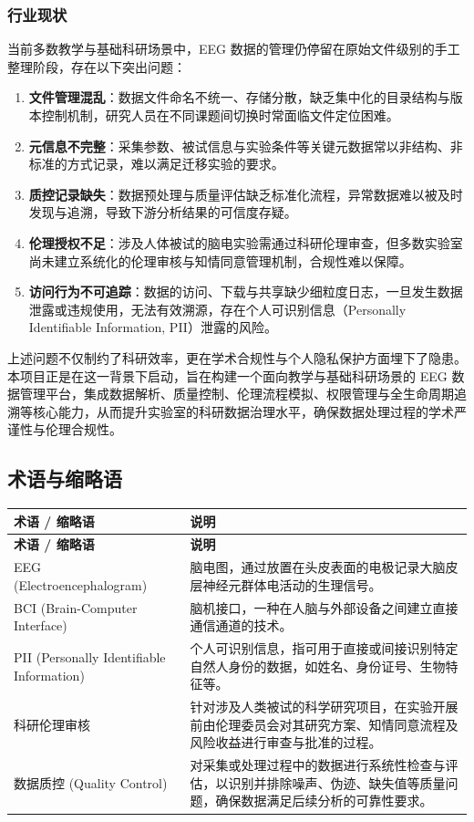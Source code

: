 \subsubsection{行业现状}

当前多数教学与基础科研场景中，EEG 数据的管理仍停留在原始文件级别的手工整理阶段，存在以下突出问题：

\begin{enumerate}
  \item \textbf{文件管理混乱}：数据文件命名不统一、存储分散，缺乏集中化的目录结构与版本控制机制，研究人员在不同课题间切换时常面临文件定位困难。
  \item \textbf{元信息不完整}：采集参数、被试信息与实验条件等关键元数据常以非结构、非标准的方式记录，难以满足迁移实验的要求。
  \item \textbf{质控记录缺失}：数据预处理与质量评估缺乏标准化流程，异常数据难以被及时发现与追溯，导致下游分析结果的可信度存疑。
  \item \textbf{伦理授权不足}：涉及人体被试的脑电实验需通过科研伦理审查，但多数实验室尚未建立系统化的伦理审核与知情同意管理机制，合规性难以保障。
  \item \textbf{访问行为不可追踪}：数据的访问、下载与共享缺少细粒度日志，一旦发生数据泄露或违规使用，无法有效溯源，存在个人可识别信息（Personally Identifiable Information, PII）泄露的风险。
\end{enumerate}

上述问题不仅制约了科研效率，更在学术合规性与个人隐私保护方面埋下了隐患。本项目正是在这一背景下启动，旨在构建一个面向教学与基础科研场景的 EEG 数据管理平台，集成数据解析、质量控制、伦理流程模拟、权限管理与全生命周期追溯等核心能力，从而提升实验室的科研数据治理水平，确保数据处理过程的学术严谨性与伦理合规性。

\subsection{术语与缩略语}

\begin{longtable}{|p{36mm}|p{116mm}|}
\hline
\textbf{术语 / 缩略语} & \textbf{说明} \\
\hline
\endfirsthead
\hline
\textbf{术语 / 缩略语} & \textbf{说明} \\
\hline
\endhead
\hline
\endfoot
EEG (Electroencephalogram) & 脑电图，通过放置在头皮表面的电极记录大脑皮层神经元群体电活动的生理信号。 \\
\hline
BCI (Brain-Computer Interface) & 脑机接口，一种在人脑与外部设备之间建立直接通信通道的技术。 \\
\hline
PII (Personally Identifiable Information) & 个人可识别信息，指可用于直接或间接识别特定自然人身份的数据，如姓名、身份证号、生物特征等。 \\
\hline
科研伦理审核 & 针对涉及人类被试的科学研究项目，在实验开展前由伦理委员会对其研究方案、知情同意流程及风险收益进行审查与批准的过程。 \\
\hline
数据质控 (Quality Control) & 对采集或处理过程中的数据进行系统性检查与评估，以识别并排除噪声、伪迹、缺失值等质量问题，确保数据满足后续分析的可靠性要求。 \\
\hline
\end{longtable}
